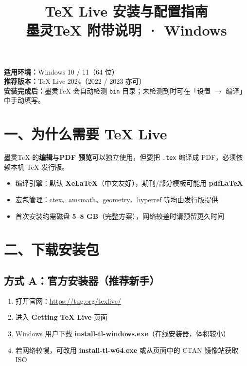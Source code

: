 \documentclass[UTF8,11pt]{article}
\title{\textcolor{accent}{\sffamily\bfseries TeX Live 安装与配置指南}\\[0.4em]
\large 墨灵TeX 附带说明 · Windows}
\author{}
\date{}
\begin{document}
\maketitle
\vspace{-1.6em}

\begin{center}
\colorbox{accent!8}{\parbox{0.96\textwidth}{%
\textbf{适用环境：}Windows 10 / 11（64 位）\\
\textbf{推荐版本：}TeX Live 2024（2022 / 2023 亦可）\\
\textbf{安装完成后：}墨灵TeX 会自动检测 \texttt{bin} 目录；未检测到时可在「设置 $\rightarrow$ 编译」中手动填写。
}}
\end{center}

\vspace{0.6em}
\section*{一、为什么需要 TeX Live}
墨灵TeX 的\textbf{编辑}与\textbf{PDF 预览}可以独立使用，但要把 \texttt{.tex} 编译成 PDF，必须依赖本机 TeX 发行版。

\begin{itemize}
  \item 编译引擎：默认 \textbf{XeLaTeX}（中文友好），期刊/部分模板可能用 \textbf{pdfLaTeX}
  \item 宏包管理：ctex、amsmath、geometry、hyperref 等均由发行版提供
  \item 首次安装约需磁盘 \textbf{5--8 GB}（完整方案），网络较差时请预留更久时间
\end{itemize}

\section*{二、下载安装包}

\subsection*{方式 A：官方安装器（推荐新手）}
\begin{enumerate}
  \item 打开官网：\url{https://tug.org/texlive/}
  \item 进入 \textbf{Getting TeX Live} 页面
  \item Windows 用户下载 \textbf{install-tl-windows.exe}（在线安装器，体积较小）
  \item 若网络较慢，可改用 \textbf{install-tl-w64.exe} 或从页面中的 CTAN 镜像站获取 ISO
\end{enumerate}
\end{document}
